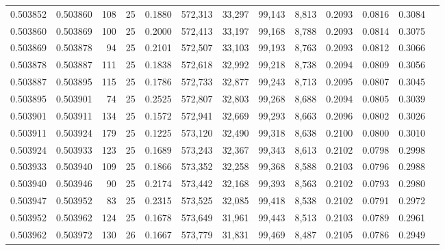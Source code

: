 \begin{tabular}{rrrrrrrrrrrrr}
0.503852 & 0.503860 & 108 &  25 &                                     0.1880 & 572,313 &  33,297 &  99,143 &   8,813 & 0.2093 & 0.0816 & 0.3084 \\
0.503860 & 0.503869 & 100 &  25 &                                     0.2000 & 572,413 &  33,197 &  99,168 &   8,788 & 0.2093 & 0.0814 & 0.3075 \\
0.503869 & 0.503878 &  94 &  25 &                                     0.2101 & 572,507 &  33,103 &  99,193 &   8,763 & 0.2093 & 0.0812 & 0.3066 \\
0.503878 & 0.503887 & 111 &  25 &                                     0.1838 & 572,618 &  32,992 &  99,218 &   8,738 & 0.2094 & 0.0809 & 0.3056 \\
0.503887 & 0.503895 & 115 &  25 &                                     0.1786 & 572,733 &  32,877 &  99,243 &   8,713 & 0.2095 & 0.0807 & 0.3045 \\
0.503895 & 0.503901 &  74 &  25 &                                     0.2525 & 572,807 &  32,803 &  99,268 &   8,688 & 0.2094 & 0.0805 & 0.3039 \\
0.503901 & 0.503911 & 134 &  25 &                                     0.1572 & 572,941 &  32,669 &  99,293 &   8,663 & 0.2096 & 0.0802 & 0.3026 \\
0.503911 & 0.503924 & 179 &  25 &                                     0.1225 & 573,120 &  32,490 &  99,318 &   8,638 & 0.2100 & 0.0800 & 0.3010 \\
0.503924 & 0.503933 & 123 &  25 &                                     0.1689 & 573,243 &  32,367 &  99,343 &   8,613 & 0.2102 & 0.0798 & 0.2998 \\
0.503933 & 0.503940 & 109 &  25 &                                     0.1866 & 573,352 &  32,258 &  99,368 &   8,588 & 0.2103 & 0.0796 & 0.2988 \\
0.503940 & 0.503946 &  90 &  25 &                                     0.2174 & 573,442 &  32,168 &  99,393 &   8,563 & 0.2102 & 0.0793 & 0.2980 \\
0.503947 & 0.503952 &  83 &  25 &                                     0.2315 & 573,525 &  32,085 &  99,418 &   8,538 & 0.2102 & 0.0791 & 0.2972 \\
0.503952 & 0.503962 & 124 &  25 &                                     0.1678 & 573,649 &  31,961 &  99,443 &   8,513 & 0.2103 & 0.0789 & 0.2961 \\
0.503962 & 0.503972 & 130 &  26 &                                     0.1667 & 573,779 &  31,831 &  99,469 &   8,487 & 0.2105 & 0.0786 & 0.2949 \\

\end{tabular}
